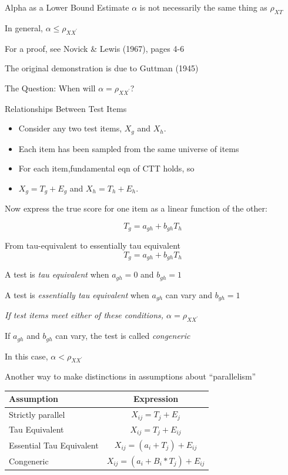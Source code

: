 \documentclass[
  ignorenonframetext,
]{beamer}
\providecommand{\tightlist}{%
  \setlength{\itemsep}{0pt}\setlength{\parskip}{0pt}}
\begin{document}
\begin{frame}{Alpha as a Lower Bound Estimate}
\protect\hypertarget{alpha-as-a-lower-bound-estimate}{}
\(\alpha\) is not necessarily the same thing as \(\rho_{XT}\)

In general, \(\alpha \leq \rho_{XX^\prime}\)

For a proof, see Novick \& Lewis (1967), pages 4-6

The original demonstration is due to Guttman (1945)

The Question: When will \(\alpha = \rho_{XX^\prime}\)?
\end{frame}

\begin{frame}{Relationships Between Test Items}
\protect\hypertarget{relationships-between-test-items}{}
\begin{itemize}
\tightlist
\item
  Consider any two test items, \(X_g\) and \(X_h\).
\item
  Each item has been sampled from the same universe of items
\item
  For each item,fundamental eqn of CTT holds, so
\item
  \(X_g = T_g + E_g\) and \(X_h = T_h + E_h\).
\end{itemize}

Now express the true score for one item as a linear function of the
other:

\[T_g = a_{gh} + b_{gh}T_{h}\]
\end{frame}

\begin{frame}{From tau-equivalent to essentially tau equivalent}
\protect\hypertarget{from-tau-equivalent-to-essentially-tau-equivalent}{}
\[T_g = a_{gh} + b_{gh}T_{h}\]

A test is \emph{tau equivalent} when \(a_{gh}=0\) and \(b_{gh}=1\)

A test is \emph{essentially tau equivalent} when \(a_{gh}\) can vary and
\(b_{gh}=1\)

\emph{If test items meet either of these conditions,
\(\alpha = \rho_{XX^\prime}\)}

If \(a_{gh}\) and \(b_{gh}\) can vary, the test is called
\emph{congeneric}

In this case, \(\alpha < \rho_{XX^\prime}\)
\end{frame}

\begin{frame}{Another way to make distinctions in assumptions about
``parallelism''}
\protect\hypertarget{another-way-to-make-distinctions-in-assumptions-about-parallelism}{}
\begin{longtable}[]{@{}lc@{}}
\toprule
Assumption & Expression \\
\midrule
\endhead
Strictly parallel & \(X_{ij} = T_j + E_j\) \\
Tau Equivalent & \(X_{ij} = T_j + E_{ij}\) \\
Essential Tau Equivalent & \(X_{ij} = (a_i + T_j) + E_{ij}\) \\
Congeneric & \(X_{ij} = (a_i + B_i*T_j) + E_{ij}\) \\
\bottomrule
\end{longtable}
\end{frame}
\end{document}
